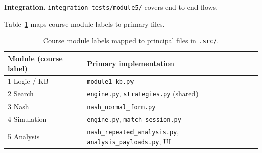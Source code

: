 \textbf{Integration.} \texttt{integration\_tests/module5/} covers end-to-end flows.

Table~\ref{tab:modmap} maps course module labels to primary files.

\begin{table}[t]
  \centering
  \caption{Course module labels mapped to principal files in \texttt{.src/}.}
  \label{tab:modmap}
  \begin{tabular}{@{}ll@{}}
    \toprule
    Module (course label) & Primary implementation \\
    \midrule
    1 Logic / KB & \texttt{module1\_kb.py} \\
    2 Search & \texttt{engine.py}, \texttt{strategies.py} (shared) \\
    3 Nash & \texttt{nash\_normal\_form.py} \\
    4 Simulation & \texttt{engine.py}, \texttt{match\_session.py} \\
    5 Analysis & \texttt{nash\_repeated\_analysis.py}, \texttt{analysis\_payloads.py}, UI \\
    \bottomrule
  \end{tabular}
\end{table}
